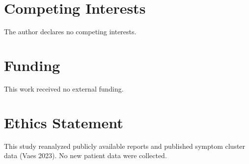 \documentclass[
  letterpaper,
  DIV=11,
  numbers=noendperiod]{scrartcl}
\begin{document}
\section*{Competing Interests}\label{competing-interests}

The author declares no competing interests.

\section*{Funding}\label{funding}

This work received no external funding.

\section*{Ethics Statement}\label{ethics-statement}

This study reanalyzed publicly available reports and published symptom
cluster data (Vaes 2023). No new patient data were collected.
\end{document}
